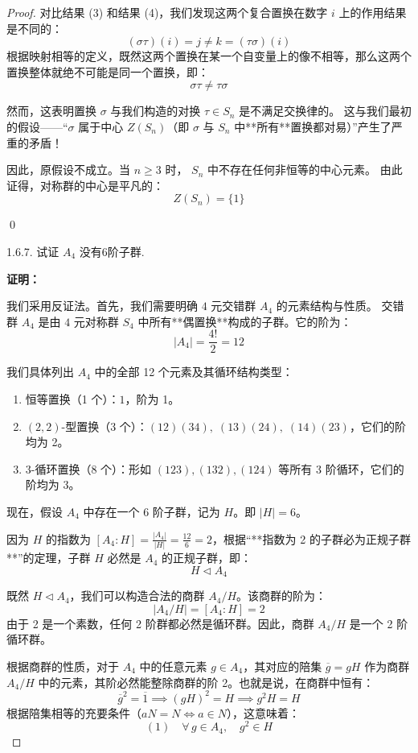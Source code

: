 \documentclass[]{article}
\begin{document}
\begin{proof}
对比结果 (3) 和结果 (4)，我们发现这两个复合置换在数字 $i$ 上的作用结果是不同的：
\[ (\sigma \tau)(i) = j \neq k = (\tau \sigma)(i) \]
根据映射相等的定义，既然这两个置换在某一个自变量上的像不相等，那么这两个置换整体就绝不可能是同一个置换，即：
\[ \sigma \tau \neq \tau \sigma \]

然而，这表明置换 $\sigma$ 与我们构造的对换 $\tau \in S_n$ 是不满足交换律的。
这与我们最初的假设——“$\sigma$ 属于中心 $Z(S_n)$（即 $\sigma$ 与 $S_n$ 中**所有**置换都对易）”产生了严重的矛盾！

因此，原假设不成立。当 $n \ge 3$ 时， $S_n$ 中不存在任何非恒等的中心元素。
由此证得，对称群的中心是平凡的：
\[ Z(S_n) = \{1\} \]

\qed

1.6.7. 试证 $A_{4}$ 没有6阶子群. 

\bigskip
\noindent \textbf{证明：} 

我们采用反证法。首先，我们需要明确 $4$ 元交错群 $A_4$ 的元素结构与性质。
交错群 $A_4$ 是由 $4$ 元对称群 $S_4$ 中所有**偶置换**构成的子群。它的阶为：
\[ |A_4| = \frac{4!}{2} = 12 \]

我们具体列出 $A_4$ 中的全部 12 个元素及其循环结构类型：
\begin{enumerate}
	\item 恒等置换（1 个）：$1$，阶为 1。
	\item $(2, 2)$-型置换（3 个）：$(12)(34), \; (13)(24), \; (14)(23)$，它们的阶均为 2。
	\item $3$-循环置换（8 个）：形如 $(123), (132), (124)$ 等所有 3 阶循环，它们的阶均为 3。
\end{enumerate}

现在，假设 $A_4$ 中存在一个 6 阶子群，记为 $H$。即 $|H| = 6$。

\bigskip
因为 $H$ 的指数为 $[A_4 : H] = \frac{|A_4|}{|H|} = \frac{12}{6} = 2$，根据“**指数为 2 的子群必为正规子群**”的定理，子群 $H$ 必然是 $A_4$ 的正规子群，即：
\[ H \triangleleft A_4 \]

既然 $H \triangleleft A_4$，我们可以构造合法的商群 $A_4/H$。该商群的阶为：
\[ |A_4/H| = [A_4 : H] = 2 \]
由于 2 是一个素数，任何 2 阶群都必然是循环群。因此，商群 $A_4/H$ 是一个 2 阶循环群。

根据商群的性质，对于 $A_4$ 中的任意元素 $g \in A_4$，其对应的陪集 $\overline{g} = gH$ 作为商群 $A_4/H$ 中的元素，其阶必然能整除商群的阶 2。也就是说，在商群中恒有：
\[ \overline{g}^2 = \overline{1} \implies (gH)^2 = H \implies g^2 H = H \]
根据陪集相等的充要条件（$aN=N \iff a \in N$），这意味着：
\[ (1) \quad \forall \, g \in A_4, \quad g^2 \in H \]


\end{proof}
\end{document}

